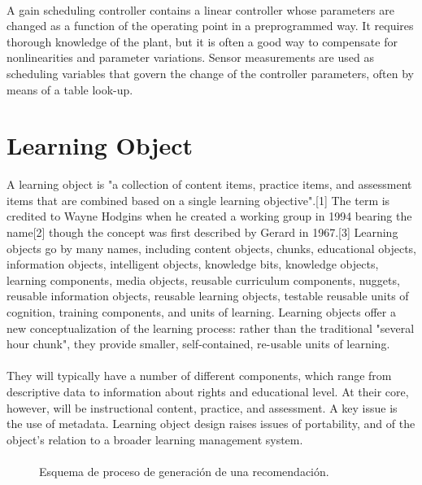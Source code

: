 \documentclass[12pt,letterpaper,oneside] {memoir}
\begin{document}
\paragraph{}
A gain scheduling controller contains a linear controller whose parameters are changed as a function of the operating point in a preprogrammed way. It requires thorough knowledge of the plant, but it is often a good way to compensate for nonlinearities and parameter variations. Sensor measurements are used as scheduling variables that govern the change of the controller parameters, often by means of a table look-up.
\paragraph{}
\section{Learning Object}
A learning object is "a collection of content items, practice items, and assessment items that are combined based on a single learning objective".[1] The term is credited to Wayne Hodgins when he created a working group in 1994 bearing the name[2] though the concept was first described by Gerard in 1967.[3] Learning objects go by many names, including content objects, chunks, educational objects, information objects, intelligent objects, knowledge bits, knowledge objects, learning components, media objects, reusable curriculum components, nuggets, reusable information objects, reusable learning objects, testable reusable units of cognition, training components, and units of learning. Learning objects offer a new conceptualization of the learning process: rather than the traditional "several hour chunk", they provide smaller, self-contained, re-usable units of learning.
\paragraph{} 
They will typically have a number of different components, which range from descriptive data to information about rights and educational level. At their core, however, will be instructional content, practice, and assessment. A key issue is the use of metadata.
Learning object design raises issues of portability, and of the object's relation to a broader learning management system.
\paragraph{}
\begin{figure}[H] 
 \centering 
{} \caption{Esquema de proceso de generación de una recomendación.} 
 \label{fig:procesoRecomendacion} 
\end{figure}
\end{document}
